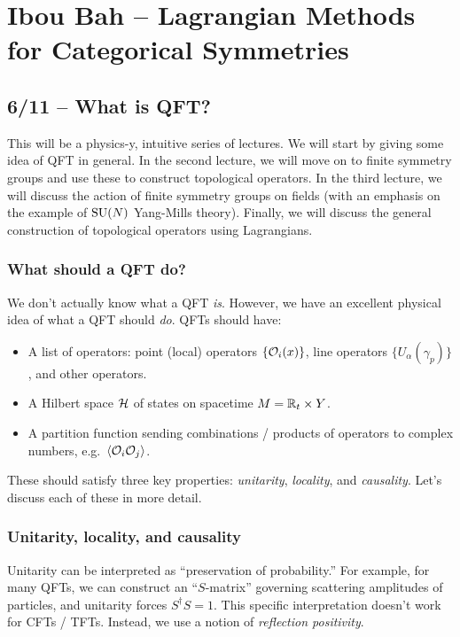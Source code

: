 \chapter{Ibou Bah -- Lagrangian Methods for Categorical Symmetries}

\section{6/11 -- What is QFT?}

This will be a physics-y, intuitive series of lectures.
We will start by giving some idea of QFT in general.
In the second lecture, we will move on to finite symmetry groups and use these to construct topological operators.
In the third lecture, we will discuss the action of finite symmetry groups on fields (with an emphasis on the example of $\mathrm{SU}(N)$ Yang-Mills theory).
Finally, we will discuss the general construction of topological operators using Lagrangians.

\subsection{What should a QFT do?}

We don't actually know what a QFT \emph{is}.
However, we have an excellent physical idea of what a QFT should \emph{do}.
QFTs should have:
\begin{itemize}
	\item A list of operators: point (local) operators $\{ \mathcal{O}_i(x) \}$, line operators $\{ U_\alpha(\gamma_p) \}$, and other operators.
	\item A Hilbert space $\mathcal{H}$ of states on spacetime $M = \mathbb{R}_t \times Y$.
	\item A partition function sending combinations / products of operators to complex numbers, e.g.\ $\langle \mathcal{O}_i \mathcal{O}_j \rangle$.
\end{itemize}
These should satisfy three key properties: \emph{unitarity}, \emph{locality}, and \emph{causality}. 
Let's discuss each of these in more detail.

\subsection{Unitarity, locality, and causality}

Unitarity can be interpreted as ``preservation of probability.''
For example, for many QFTs, we can construct an ``$S$-matrix'' governing scattering amplitudes of particles, and unitarity forces $S^\dagger S = 1$.
This specific interpretation doesn't work for CFTs / TFTs.
Instead, we use a notion of \emph{reflection positivity}.

